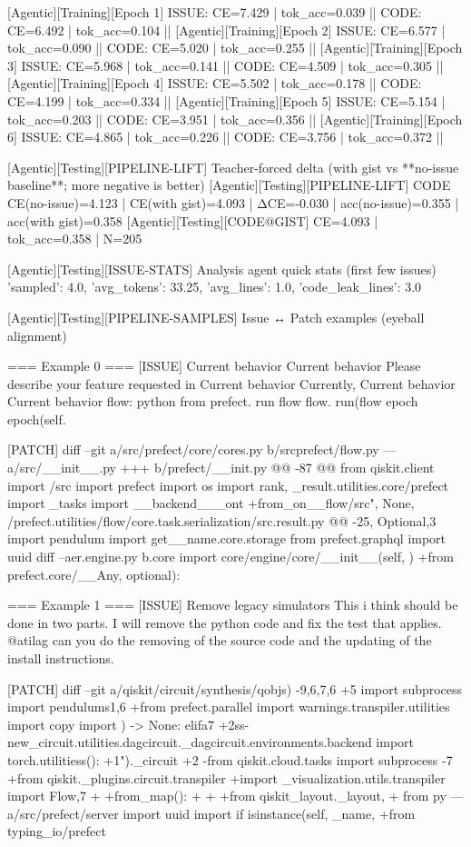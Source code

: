  [Agentic][Training][Epoch 1] ISSUE: CE=7.429 | tok_acc=0.039  ||  CODE: CE=6.492 | tok_acc=0.104  ||  
 [Agentic][Training][Epoch 2] ISSUE: CE=6.577 | tok_acc=0.090  ||  CODE: CE=5.020 | tok_acc=0.255  ||  
 [Agentic][Training][Epoch 3] ISSUE: CE=5.968 | tok_acc=0.141  ||  CODE: CE=4.509 | tok_acc=0.305  ||  
 [Agentic][Training][Epoch 4] ISSUE: CE=5.502 | tok_acc=0.178  ||  CODE: CE=4.199 | tok_acc=0.334  ||  
 [Agentic][Training][Epoch 5] ISSUE: CE=5.154 | tok_acc=0.203  ||  CODE: CE=3.951 | tok_acc=0.356  ||  
 [Agentic][Training][Epoch 6] ISSUE: CE=4.865 | tok_acc=0.226  ||  CODE: CE=3.756 | tok_acc=0.372  ||  
 
 [Agentic][Testing][PIPELINE-LIFT] Teacher-forced delta (with gist vs **no-issue baseline**; more negative is better)
 [Agentic][Testing][PIPELINE-LIFT] CODE CE(no-issue)=4.123 | CE(with gist)=4.093 | ΔCE=-0.030 | acc(no-issue)=0.355 | acc(with gist)=0.358
 [Agentic][Testing][CODE@GIST] CE=4.093 | tok_acc=0.358 | N=205
 
 [Agentic][Testing][ISSUE-STATS] Analysis agent quick stats (first few issues)
 {'sampled': 4.0, 'avg_tokens': 33.25, 'avg_lines': 1.0, 'code_leak_lines': 3.0}
 
 [Agentic][Testing][PIPELINE-SAMPLES] Issue ↔ Patch examples (eyeball alignment)
 
 === Example 0 ===
 [ISSUE]
 Current behavior Current behavior Please describe your feature requested in Current behavior Currently, Current behavior Current behavior flow: python from prefect. run flow flow. run(flow epoch epoch(self.
 
 [PATCH]
 diff --git a/src/prefect/core/cores.py b/srcprefect/flow.py --- a/src/__init__.py +++ b/prefect/__init.py @@ -87 @@ from qiskit.client import /src import prefect import os import rank, _result.utilities.core/prefect import _tasks import __backend___ont +from_on__flow/src", None, /prefect.utilities/flow/core.task.serialization/src.result.py @@ -25, Optional,3 import pendulum import get__name.core.storage from prefect.graphql import uuid diff --aer.engine.py b.core import core/engine/core/__init__(self, ) +from prefect.core/__Any, optional):
 
 === Example 1 ===
 [ISSUE]
 Remove legacy simulators This i think should be done in two parts. I will remove the python code and fix the test that applies. @atilag can you do the removing of the source code and the updating of the install instructions.
 
 [PATCH]
 diff --git a/qiskit/circuit/synthesis/qobjs) -9,6,7,6 +5 import subprocess import pendulums1,6 +from prefect.parallel import warnings.transpiler.utilities import copy import ) -> None: elifa7 +2ss-new_circuit.utilities.dagcircuit._dagcircuit.environments.backend import torch.utilitiess(): +1")._circuit +2 -from qiskit.cloud.tasks import subprocess -7 +from qiskit._plugins.circuit.transpiler +import _visualization.utils.transpiler import Flow,7 + +from_map(): + + +from qiskit_layout._layout, + from py --- a/src/prefect/server import uuid import if isinstance(self, _name, +from typing_io/prefect
 
